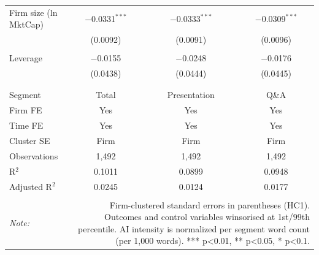 \begin{table}[!htbp]
\begin{tabular}{@{\extracolsep{5pt}}lccc}
 Firm size (ln MktCap) & $-$0.0331$^{***}$ & $-$0.0333$^{***}$ & $-$0.0309$^{***}$ \\ 
  & (0.0092) & (0.0091) & (0.0096) \\ 
  & & & \\ 
 Leverage & $-$0.0155 & $-$0.0248 & $-$0.0176 \\ 
  & (0.0438) & (0.0444) & (0.0445) \\ 
  & & & \\ 
\hline \\[-1.8ex] 
Segment & Total & Presentation & Q\&A \\ 
Firm FE & Yes & Yes & Yes \\ 
Time FE & Yes & Yes & Yes \\ 
Cluster SE & Firm & Firm & Firm \\ 
Observations & 1,492 & 1,492 & 1,492 \\ 
R$^{2}$ & 0.1011 & 0.0899 & 0.0948 \\ 
Adjusted R$^{2}$ & 0.0245 & 0.0124 & 0.0177 \\ 
\hline 
\hline \\[-1.8ex] 
\textit{Note:}  & \multicolumn{3}{r}{Firm-clustered standard errors in parentheses (HC1). Outcomes and control variables winsorised at 1st/99th percentile. AI intensity is normalized per segment word count (per 1,000 words). *** p<0.01, ** p<0.05, * p<0.1.} \\ 
\end{tabular} 
\end{table} 
